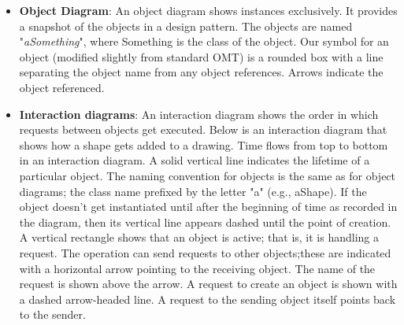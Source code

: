 \documentclass{report}
\begin{document}
\begin{itemize}
            \bigbreak \noindent 
            \bigbreak \noindent 
            Another useful thing to show is which classes instantiate which others. We use a dashed arrow-headed line to indicate this, since OMT doesn't support it. We call this the "\textbf{creates}" relationship. The arrow points to the class that's instantiated.  CreationTool creates LineShape objects. 
            \bigbreak \noindent 
            OMT also defines a filled circle to mean "more than one." When the circle appears at the head of a reference, it means multiple objects are being referenced or aggregated. Figure B.1c shows that Drawing aggregates multiple objects of type Shape.
            \bigbreak \noindent 
            Finally, we've augmented OMT with pseudocode annotations to let us sketch the implementations of operations.
            \bigbreak \noindent 
        \item \textbf{Object Diagram}: An object diagram shows instances exclusively. It provides a snapshot of the objects in a design pattern. The objects are named "\textit{aSomething}", where Something is the class of the object. Our symbol for an object (modified slightly from standard OMT) is a rounded box with a line separating the object name from any object references. Arrows indicate the object referenced.
            \bigbreak \noindent 
        \item \textbf{Interaction diagrams}: An interaction diagram shows the order in which requests between objects get executed. Below is an interaction diagram that shows how a shape gets added to a drawing. 
            \bigbreak \noindent 
            \bigbreak \noindent 
            Time flows from top to bottom in an interaction diagram. A solid vertical line indicates the lifetime of a particular object. The naming convention for objects is the same as for object diagrams; the class name prefixed by the letter "a" (e.g., aShape). If the object doesn't get instantiated until after the beginning of time as recorded in the diagram, then its vertical line appears dashed until the point of creation.
            \bigbreak \noindent 
            A vertical rectangle shows that an object is active; that is, it is handling a request. The operation can send requests to other objects;these are indicated with a horizontal arrow pointing to the receiving object. The name of the request is shown above the arrow. A request to create an object is shown with a dashed arrow-headed line. A request to the sending object itself points back to the sender.
            



    \end{itemize}
\end{document}
